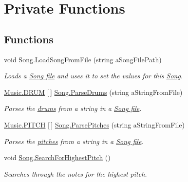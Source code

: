 \hypertarget{group___song_priv_func}{}\section{Private Functions}
\label{group___song_priv_func}
\subsection*{Functions}
\begin{DoxyCompactItemize}
\item 
void \hyperlink{group___song_priv_func_ga5c8edd8f7ebeab0d93f5619a644c30f5}{Song.\+Load\+Song\+From\+File} (string a\+Song\+File\+Path)
\begin{DoxyCompactList}\small\item\em Loads a \hyperlink{group___song_group_DocSongFileFormat}{Song file} and uses it to set the values for this \hyperlink{class_song}{Song}. \end{DoxyCompactList}\item 
\hyperlink{group___music_enums_gade475b4382c7066d1af13e7c13c029b6}{Music.\+D\+R\+UM} \mbox{[}$\,$\mbox{]} \hyperlink{group___song_priv_func_gaaa4ca12f0885a34cbfb09bb7a1db178b}{Song.\+Parse\+Drums} (string a\+String\+From\+File)
\begin{DoxyCompactList}\small\item\em Parses the \hyperlink{group___music_enums_gade475b4382c7066d1af13e7c13c029b6}{drums} from a string in a \hyperlink{group___song_group_DocSongFileFormat}{Song file}. \end{DoxyCompactList}\item 
\hyperlink{group___music_enums_ga508f69b199ea518f935486c990edac1d}{Music.\+P\+I\+T\+CH} \mbox{[}$\,$\mbox{]} \hyperlink{group___song_priv_func_gacf6fee93921e1a5edbc477c0898c357a}{Song.\+Parse\+Pitches} (string a\+String\+From\+File)
\begin{DoxyCompactList}\small\item\em Parses the \hyperlink{group___music_enums_ga508f69b199ea518f935486c990edac1d}{pitches} from a string in a \hyperlink{group___song_group_DocSongFileFormat}{Song file}. \end{DoxyCompactList}\item 
void \hyperlink{group___song_priv_func_ga5f837e6b7f576732fa38747caa057621}{Song.\+Search\+For\+Highest\+Pitch} ()
\begin{DoxyCompactList}\small\item\em Searches through the notes for the highest pitch. \end{DoxyCompactList}\item 

\end{DoxyCompactItemize}
